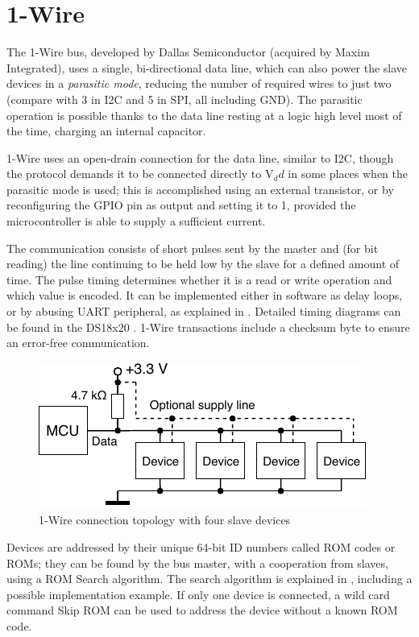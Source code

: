 \section{1-Wire} \label{sec:theory-1wire}

The 1-Wire bus, developed by Dallas Semiconductor (acquired by Maxim Integrated), uses a single, bi-directional data line, which can also power the slave devices in a \textit{parasitic mode}, reducing the number of required wires to just two (compare with 3 in \gls{I2C} and 5 in \gls{SPI}, all including \gls{GND}). The parasitic operation is possible thanks to the data line resting at a logic high level most of the time, charging an internal capacitor.

1-Wire uses an open-drain connection for the data line, similar to \gls{I2C}, though the protocol demands it to be connected directly to V$_dd$ in some places when the parasitic mode is used; this is accomplished using an external transistor, or by reconfiguring the GPIO pin as output and setting it to 1, provided the microcontroller is able to supply a sufficient current.

The communication consists of short pulses sent by the master and (for bit reading) the line continuing to be held low by the slave for a defined amount of time. The pulse timing determines whether it is a read or write operation and which value is encoded. It can be implemented either in software as delay loops, or by abusing \gls{UART} peripheral, as explained in \cite{ow-uart}. Detailed timing diagrams can be found in the DS18x20 \cite{ow-datasheet}. 1-Wire transactions include a checksum byte to ensure an error-free communication.

\begin{figure}[h]
	\centering
	\includegraphics[scale=1] {img/1w-connection.pdf}
	\caption{\label{fig:1w-topology}1-Wire connection topology with four slave devices}
\end{figure}

Devices are addressed by their unique 64-bit ID numbers called ROM codes or ROMs; they can be found by the bus master, with a cooperation from slaves, using a ROM Search algorithm. The search algorithm is explained in \cite{ow-appnote}, including a possible implementation example. If only one device is connected, a wild card command Skip ROM can be used to address the device without a known ROM code.

